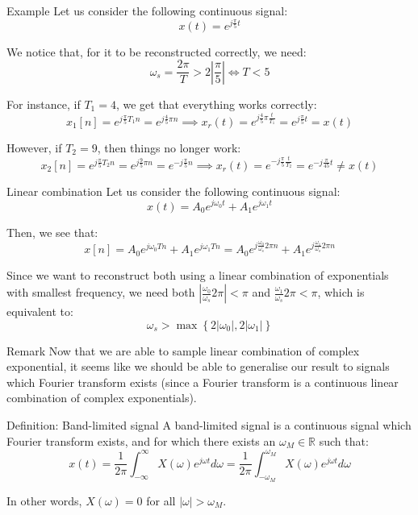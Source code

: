 \documentclass[a4paper]{article}
\begin{document}
\begin{parag}{Example}
    Let us consider the following continuous signal:
    \[x\left(t\right) = e^{j \frac{\pi}{5}t}\]
    
    We notice that, for it to be reconstructed correctly, we need: 
    \[\omega_s = \frac{2\pi}{T} > 2\left|\frac{\pi}{5}\right| \iff T < 5 \]

    For instance, if $T_1 = 4$, we get that everything works correctly: 
    \[x_1\left[n\right] = e^{j \frac{\pi}{5}T_1 n} = e^{j \frac{4}{5}\pi n} \implies x_r\left(t\right) = e^{j\frac{4}{5}\pi \frac{t}{T_1}} = e^{j \frac{\pi}{5}t} = x\left(t\right)\]
    
    However, if $T_2 = 9$, then things no longer work: 
    \[x_2\left[n\right] = e^{j\frac{\pi}{5}T_2 n} = e^{j\frac{9}{5}\pi n} = e^{-j \frac{\pi}{5}n} \implies x_r\left(t\right) = e^{-j \frac{\pi}{5} \frac{t}{T_2}} = e^{-j \frac{\pi}{45}t} \neq x\left(t\right)\]
\end{parag}

\begin{parag}{Linear combination}
    Let us consider the following continuous signal: 
    \[x\left(t\right) = A_0 e^{j \omega_0 t} + A_1 e^{j\omega_1 t}\]

    Then, we see that: 
    \[x\left[n\right] = A_0 e^{j \omega_0 T n} + A_1 e^{j \omega_1 T n} = A_0 e^{j \frac{\omega_0}{\omega_s} 2\pi n} + A_1 e^{j \frac{\omega_1}{\omega_s} 2\pi n}\]
    
    Since we want to reconstruct both using a linear combination of exponentials with smallest frequency, we need both $\left|\frac{\omega_0}{\omega_s} 2\pi\right| < \pi$ and $\frac{\omega_1}{\omega_s} 2\pi < \pi$, which is equivalent to: 
    \[\omega_s > \max\left\{2\left|\omega_0\right|, 2\left|\omega_1\right|\right\}\]

    \begin{subparag}{Remark}
        Now that we are able to sample linear combination of complex exponential, it seems like we should be able to generalise our result to signals which Fourier transform exists (since a Fourier transform is a continuous linear combination of complex exponentials).
    \end{subparag}
    
\end{parag}

\begin{parag}{Definition: Band-limited signal}
    A band-limited signal is a continuous signal which Fourier transform exists, and for which there exists an $\omega_M \in \mathbb{R}$ such that:
    \[x\left(t\right) = \frac{1}{2\pi} \int_{-\infty}^{\infty} X\left(\omega\right) e^{j \omega t} d\omega = \frac{1}{2\pi} \int_{-\omega_M}^{\omega_M} X\left(\omega\right) e^{j \omega t} d\omega\]
    
    In other words, $X\left(\omega\right) = 0$ for all $\left|\omega\right| > \omega_M$.
\end{parag}
\end{document}
